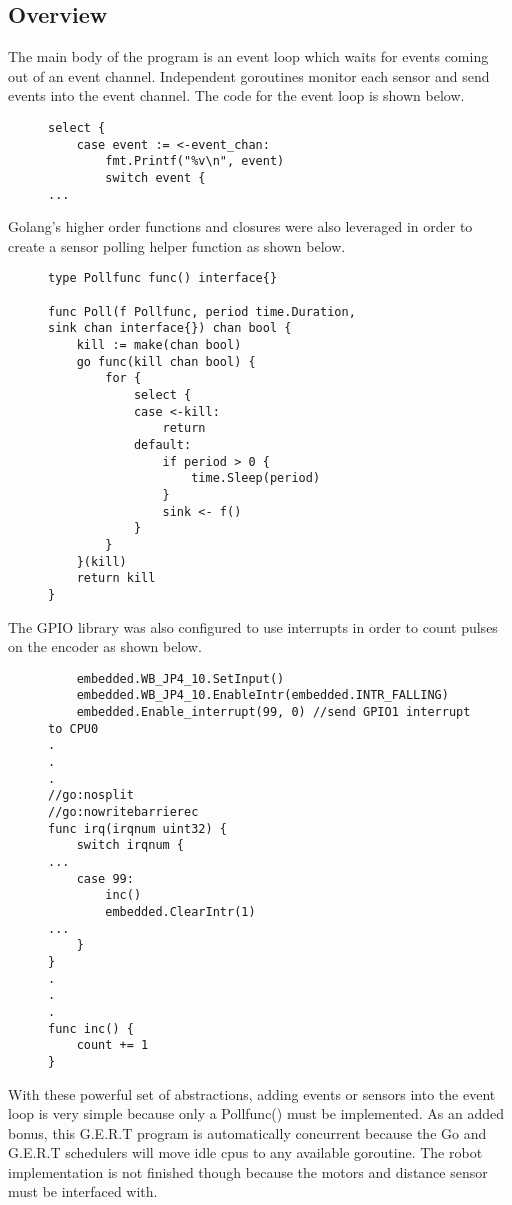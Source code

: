 \subsection{Overview}
The main body of the program is an event loop which waits for events coming out of an event channel.
Independent goroutines monitor each sensor and send events into the event channel. The code for the
event loop is shown below.

\begin{figure}[h]
\begin{lstlisting}
select {
	case event := <-event_chan:
		fmt.Printf("%v\n", event)
		switch event {
...
\end{lstlisting}
\end{figure}

Golang's higher order functions and closures were also leveraged in order to create a sensor polling helper function
as shown below.

\begin{figure}[h]
\begin{lstlisting}
type Pollfunc func() interface{}

func Poll(f Pollfunc, period time.Duration,
sink chan interface{}) chan bool {
	kill := make(chan bool)
	go func(kill chan bool) {
		for {
			select {
			case <-kill:
				return
			default:
				if period > 0 {
					time.Sleep(period)
				}
				sink <- f()
			}
		}
	}(kill)
	return kill
}
\end{lstlisting}
\end{figure}

The GPIO library was also configured to use interrupts in order to count pulses on the encoder as shown below.

\begin{figure}[h]
\begin{lstlisting}
	embedded.WB_JP4_10.SetInput()
	embedded.WB_JP4_10.EnableIntr(embedded.INTR_FALLING)
	embedded.Enable_interrupt(99, 0) //send GPIO1 interrupt to CPU0
.
.
.
//go:nosplit
//go:nowritebarrierec
func irq(irqnum uint32) {
	switch irqnum {
...
	case 99:
		inc()
		embedded.ClearIntr(1)
...
	}
}
.
.
.
func inc() {
	count += 1
}

\end{lstlisting}
\end{figure}

With these powerful set of abstractions, adding events or sensors into the event loop
is very simple because only a Pollfunc() must be implemented. As an added bonus, this
G.E.R.T program is automatically concurrent because the Go and G.E.R.T schedulers will
move idle cpus to any available goroutine. The robot implementation is not finished though
because the motors and distance sensor must be interfaced with.

